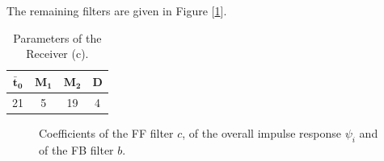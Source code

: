 \documentclass[a4paper, 12pt]{report}
\begin{document}
The remaining filters are given in Figure [\ref{rec_c}].
\begin{table}[H]
	\centering
	\begin{tabular}{c c c c}
		\toprule
		$\mathbf{\bar{t}_0}$ & $\mathbf{M_1}$ & $\mathbf{M_2}$ & \textbf{D}     \\
		\midrule
		21 & 5 & 19 & 4 \\
		\bottomrule			
	\end{tabular}
	\caption{Parameters of the Receiver (c).}
	\label{Tab_c}
\end{table}

\begin{figure}[H]
	\centering
	\quad
	\caption{Coefficients of the FF filter $c$, of the overall impulse response $\psi_i$ and of the FB filter $b$.}\label{rec_c}
\end{figure}
\end{document}
